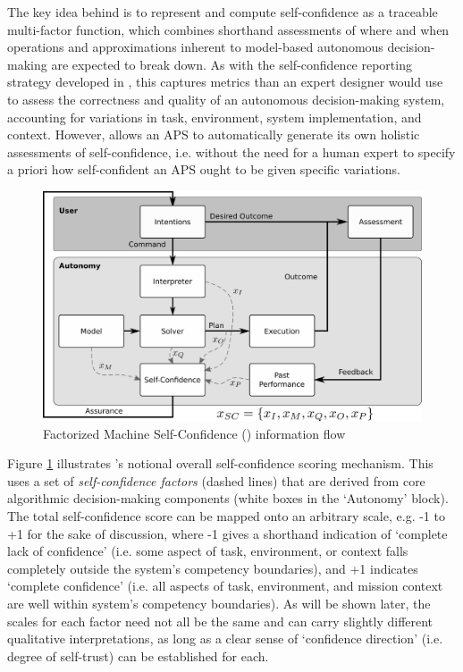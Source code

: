     The key idea behind \famsec{} is to represent and compute self-confidence as a traceable multi-factor function, which combines shorthand assessments of where and when operations and approximations inherent to model-based autonomous decision-making are expected to break down. As with the self-confidence reporting strategy developed in \cite{Hutchins2015-if}, this captures metrics than an expert designer would use to assess the correctness and quality of an autonomous decision-making system, accounting for variations in task, environment, system implementation, and context. However, \famsec{} allows an APS to automatically generate its own holistic assessments of self-confidence, i.e. without the need for a human expert to specify a priori how self-confident an APS ought to be given specific variations. %
    
    
        \begin{figure}[tbp]
        \centering
        \includegraphics[width=0.6\linewidth]{Figures/FaMSeC.png}
        \caption{Factorized Machine Self-Confidence (\famsec) information flow}
        \label{fig:famsec}
    \end{figure}
    
    Figure \ref{fig:famsec} illustrates \famsec's notional overall self-confidence scoring mechanism. This uses a set of \emph{self-confidence factors} (dashed lines) that are derived from core algorithmic decision-making components (white boxes in the `Autonomy' block). The total self-confidence score can be mapped onto an arbitrary scale, e.g. -1 to +1 for the sake of discussion, where -1 gives a shorthand indication of `complete lack of confidence' (i.e. some aspect of task, environment, or context falls completely outside the system's competency boundaries), and +1 indicates `complete confidence' (i.e. all aspects of task, environment, and mission context are well within system's competency boundaries). As will be shown later, the scales for each factor need not all be the same and can carry slightly different qualitative interpretations, as long as a clear sense of `confidence direction' (i.e. degree of self-trust) can be established for each.
    
